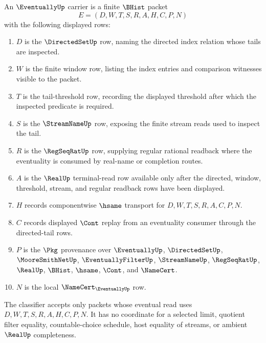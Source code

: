 \begin{definition}
\label{def:eventually-carrier}
An $\EventuallyUp$ carrier is a finite $\BHist$ packet
$$
E=(D,W,T,S,R,A,H,C,P,N)
$$
with the following displayed rows:
\begin{enumerate}
\item $D$ is the $\DirectedSetUp$ row, naming the directed index relation whose tails are inspected.
\item $W$ is the finite window row, listing the index entries and comparison witnesses visible to the packet.
\item $T$ is the tail-threshold row, recording the displayed threshold after which the inspected predicate is required.
\item $S$ is the $\StreamNameUp$ row, exposing the finite stream reads used to inspect the tail.
\item $R$ is the $\RegSeqRatUp$ row, supplying regular rational readback where the eventuality is consumed by real-name or completion routes.
\item $A$ is the $\RealUp$ terminal-read row available only after the directed, window, threshold, stream, and regular readback rows have been displayed.
\item $H$ records componentwise $\hsame$ transport for $D,W,T,S,R,A,C,P,N$.
\item $C$ records displayed $\Cont$ replay from an eventuality consumer through the directed-tail rows.
\item $P$ is the $\Pkg$ provenance over $\EventuallyUp$, $\DirectedSetUp$, $\MooreSmithNetUp$, $\EventuallyFilterUp$, $\StreamNameUp$, $\RegSeqRatUp$, $\RealUp$, $\BHist$, $\hsame$, $\Cont$, and $\NameCert$.
\item $N$ is the local $\NameCert_{\EventuallyUp}$ row.
\end{enumerate}
The classifier accepts only packets whose eventual read uses $D,W,T,S,R,A,H,C,P,N$. It has no coordinate for a selected limit, quotient filter equality, countable-choice schedule, host equality of streams, or ambient $\RealUp$ completeness.
\end{definition}

